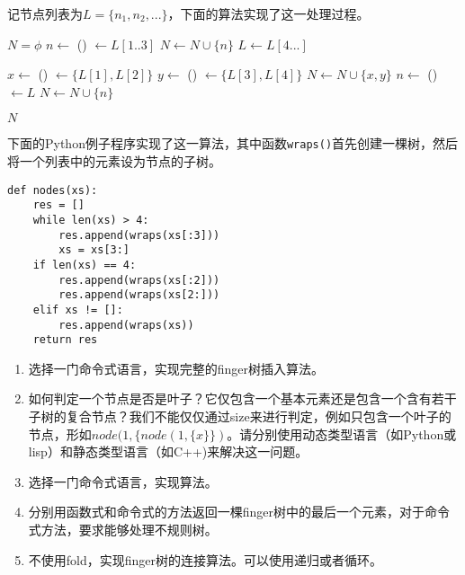 \documentclass[UTF8]{article}
\begin{document}
记节点列表为$L=\{ n_1, n_2, ... \}$，下面的算法实现了这一处理过程。

\begin{algorithmic}
  \State $N = \phi$
    \State $n \gets$ ()
    \State {} $\gets L[1..3]$  
    \State $N \gets N \cup \{ n \}$
    \State $L \gets L[4...]$ 
  \EndWhile

    \State $x \gets$ ()
    \State {} $\gets \{L[1], L[2]\}$
    \State $y \gets$ ()
    \State {} $\gets \{L[3], L[4]\}$
    \State $N \gets N \cup \{ x, y \}$
    \State $n \gets$ ()
    \State {} $\gets L$
    \State $N \gets N \cup \{ n \}$
  \EndIf

  \State \Return $N$
\EndFunction
\end{algorithmic}

下面的Python例子程序实现了这一算法，其中函数\texttt{wraps()}首先创建一棵树，然后将一个列表中的元素设为节点的子树。

\begin{lstlisting}
def nodes(xs):
    res = []
    while len(xs) > 4:
        res.append(wraps(xs[:3]))
        xs = xs[3:]
    if len(xs) == 4:
        res.append(wraps(xs[:2]))
        res.append(wraps(xs[2:]))
    elif xs != []:
        res.append(wraps(xs))
    return res
\end{lstlisting}

\begin{Exercise}
\begin{enumerate}
\item 选择一门命令式语言，实现完整的finger树插入算法。

\item 如何判定一个节点是否是叶子？它仅包含一个基本元素还是包含一个含有若干子树的复合节点？我们不能仅仅通过size来进行判定，例如只包含一个叶子的节点，形如$node(1, \{node(1, \{x\}\})$。请分别使用动态类型语言（如Python或lisp）和静态类型语言（如C++)来解决这一问题。

\item 选择一门命令式语言，实现算法。

\item 分别用函数式和命令式的方法返回一棵finger树中的最后一个元素，对于命令式方法，要求能够处理不规则树。

\item 不使用fold，实现finger树的连接算法。可以使用递归或者循环。
\end{enumerate}
\end{Exercise}
\end{document}
